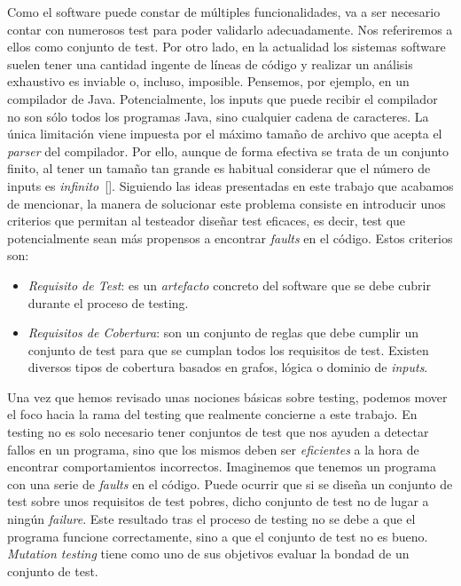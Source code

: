 Como el software puede constar de múltiples funcionalidades, va a ser necesario contar con numerosos test para poder validarlo adecuadamente. Nos referiremos a ellos como conjunto de test.
%
Por otro lado, en la actualidad los sistemas software suelen tener una cantidad ingente de líneas de código y realizar un análisis exhaustivo es inviable o, incluso, imposible. 
Pensemos, por ejemplo, en un compilador de Java. Potencialmente, los inputs que puede recibir el compilador no son sólo todos los programas Java, sino cualquier cadena de caracteres. La única limitación viene impuesta por el máximo tamaño de archivo que acepta el \textit{parser} del compilador. Por ello, aunque de forma efectiva se trata de un conjunto finito, al tener un tamaño tan grande es habitual considerar que  el número de inputs es {\it infinito}~[\cite{ammann2016introduction}].
%
Siguiendo las ideas presentadas en este trabajo que acabamos de mencionar, la manera de solucionar este problema consiste en introducir unos criterios que permitan al testeador diseñar test eficaces, es decir, test que potencialmente sean más propensos a encontrar \textit{faults} en el código. Estos criterios son:
\begin{itemize}
\item \emph{Requisito de Test}: es un \emph{artefacto} concreto del software que se debe cubrir durante el proceso de testing.
\item \emph{Requisitos de Cobertura}: son un conjunto de reglas que debe cumplir un conjunto de test para que se cumplan todos los requisitos de test. Existen diversos tipos de cobertura basados en grafos, lógica  o dominio de \textit{inputs}.
\end{itemize}

Una vez que hemos revisado unas nociones básicas sobre testing, podemos mover el foco hacia la rama del testing que realmente concierne a este trabajo. En testing no es solo necesario tener conjuntos de test que nos ayuden a detectar fallos en un programa, sino que los mismos deben ser \emph{eficientes} a la hora de encontrar comportamientos incorrectos. Imaginemos que tenemos un programa con una serie de \emph{faults} en el código. Puede ocurrir que si se diseña un conjunto de test sobre unos requisitos de test pobres, dicho conjunto de test no de lugar a ningún \emph{failure}. Este resultado tras el proceso de testing  no se debe a que el programa funcione correctamente, sino a que el conjunto de test no es bueno. \textit{Mutation testing} tiene como uno de sus objetivos evaluar la bondad de un conjunto de test.

